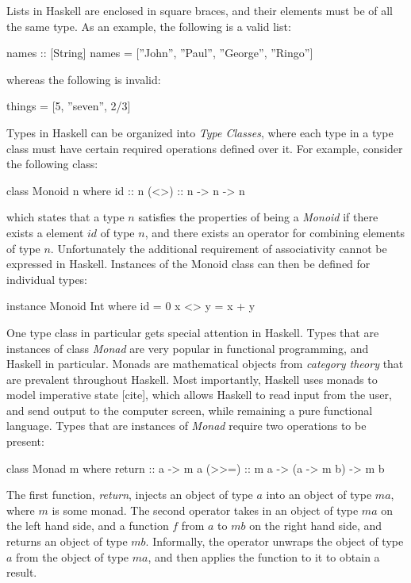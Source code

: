 \documentclass[thesis.tex]{subfiles}
\begin{document}
Lists in Haskell are enclosed in square braces, and their elements must be of all
the same type. As an example, the following is a valid list:

\begin{spec}
names :: [String]
names = [''John'', ''Paul'', ''George'', ''Ringo'']
\end{spec}

whereas the following is invalid:

\begin{spec}
things = [5, ''seven'', 2/3]
\end{spec}

Types in Haskell can be organized into \emph{Type Classes}, where each type in a
type class must have certain required operations defined over it. For example, consider
the following class:

\begin{spec}
class Monoid n where
    id  :: n
    (<>) :: n -> n -> n
\end{spec}

which states that a type $n$ satisfies the properties of being a \emph{Monoid} if there exists
a element $id$ of type $n$, and there exists an operator for combining elements of type $n$.
Unfortunately the additional requirement of associativity cannot be expressed in Haskell.
Instances of the Monoid class can then be defined for individual types:

\begin{spec}
instance Monoid Int where
    id = 0
    x <> y = x + y
\end{spec}

One type class in particular gets special attention in Haskell. Types that are instances of
class \emph{Monad} are very popular in functional programming, and Haskell in particular. Monads
are mathematical objects from \emph{category theory} that are prevalent throughout Haskell. Most
importantly, Haskell uses monads to model imperative state [cite], which allows Haskell to read
input from the user, and send output to the computer screen, while remaining a pure functional
language. Types that are instances of \emph{Monad} require two operations to be present:

\begin{spec}
class Monad m where
    return :: a -> m a
    (>>=)  :: m a -> (a -> m b) -> m b
\end{spec}

The first function, \emph{return}, injects an object of type $a$ into an object of type $m a$, where
$m$ is some monad. The second operator takes in an object of type $m a$ on the left hand side, and
a function $f$ from $a$ to $m b$ on the right hand side, and returns an object of type $m b$.
Informally, the operator unwraps the object of type $a$ from the object of type $m a$, and then applies
the function to it to obtain a result.
\end{document}
